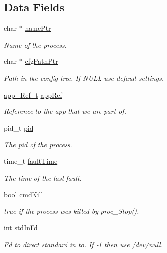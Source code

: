 \subsection*{Data Fields}
\begin{DoxyCompactItemize}
\item 
char $\ast$ \hyperlink{struct_process__t_a152dc3ab40035d6bc5a81ce724c0bd9b}{name\+Ptr}
\begin{DoxyCompactList}\small\item\em Name of the process. \end{DoxyCompactList}\item 
char $\ast$ \hyperlink{struct_process__t_af716106d703f24120088f731eecf3bcd}{cfg\+Path\+Ptr}
\begin{DoxyCompactList}\small\item\em Path in the config tree. If N\+U\+LL use default settings. \end{DoxyCompactList}\item 
\hyperlink{daemons_2linux_2supervisor_2app_8h_abe19231bb456bb0f61b343fd1d85ba42}{app\+\_\+\+Ref\+\_\+t} \hyperlink{struct_process__t_a1434606b1a1fa2b527c8dd4edef86265}{app\+Ref}
\begin{DoxyCompactList}\small\item\em Reference to the app that we are part of. \end{DoxyCompactList}\item 
pid\+\_\+t \hyperlink{struct_process__t_a6403a307f720bbb03844e1a3cc5d9d1f}{pid}
\begin{DoxyCompactList}\small\item\em The pid of the process. \end{DoxyCompactList}\item 
time\+\_\+t \hyperlink{struct_process__t_a30931809987ff384cd4ad0ced6cca943}{fault\+Time}
\begin{DoxyCompactList}\small\item\em The time of the last fault. \end{DoxyCompactList}\item 
bool \hyperlink{struct_process__t_ac3a5f2a7ded7c950a2b729ccd485aa3e}{cmd\+Kill}
\begin{DoxyCompactList}\small\item\em true if the process was killed by proc\+\_\+\+Stop(). \end{DoxyCompactList}\item 
int \hyperlink{struct_process__t_a62192e689f98e146c6e359e19786837c}{std\+In\+Fd}
\begin{DoxyCompactList}\small\item\em Fd to direct standard in to. If -\/1 then use /dev/null. \end{DoxyCompactList}\item 

\end{DoxyCompactItemize}
